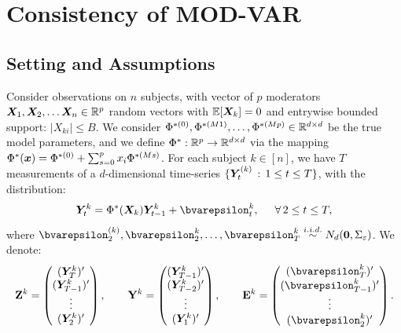 	


\section{Consistency of MOD-VAR}

\subsection{Setting and Assumptions}

Consider observations on $n$ subjects, with vector of $p$ moderators $\bm{X}_1,  \bm{X}_2,\ldots \bm{X}_n \in \mathbb{R}^p$ random vectors with $\mathbb{E}[\bm{X}_k] = 0$ and entrywise bounded support: $|X_{ki}|\leq B$. We consider  $\Phi^{*(0)}, \Phi^{*(M1)}, \ldots, \Phi^{*(Mp)} \in \mathbb{R}^{d\times d}$  be the true model parameters, and we define $\Phi^* :\mathbb{R}^p \to \mathbb{R}^{d\times d}$ via the mapping $\Phi^*(\bm{x}) = \Phi^{*(0)} + \sum_{s = 0}^p x_i\Phi^{*(Ms)} $. For each subject $k\in[n]$, we have $T$ measurements of a $d$-dimensional time-series $\{\bm{Y}^{(k)}_t \,:\, 1\leq t\leq T\}$, with the distribution:
\begin{equation}\label{eq:mod_var_vec}
    \bY^{k}_t = \Phi^*(\bX_k) \bY^{k}_{t-1} + \bvarepsilon_{t}^{k}, \hspace{5mm} \forall\, 2\leq t\leq T,    
\end{equation}
where $\bvarepsilon^{(k)}_2, \bvarepsilon^k_2, \ldots ,\bvarepsilon^k_T\stackrel{i.i.d.}{\sim}  N_d(\bzero, \Sigma_\varepsilon)$.
We denote:
\begin{equation}
    \Zb^{k} = \begin{pmatrix}
        (\bY^{k}_T)'\\ (\bY^{k}_{T-1})'\\ \vdots \\(\bY^{k}_{2})'\\ 
    \end{pmatrix}, \hspace{7mm}
    \Yb^{k} =  \begin{pmatrix}
        (\bY^{k}_{T-1})'\\ (\bY^{k}_{T-2})'\\ \vdots \\(\bY^{k}_{1})'\\ 
    \end{pmatrix}, \hspace{7mm}
    \Eb^{k} =  \begin{pmatrix}
        (\bvarepsilon^{k}_{T})'\\ (\bvarepsilon^{k}_{T-1})'\\ \vdots \\(\bvarepsilon^{k}_{2})'\\ 
    \end{pmatrix}.
\end{equation}
